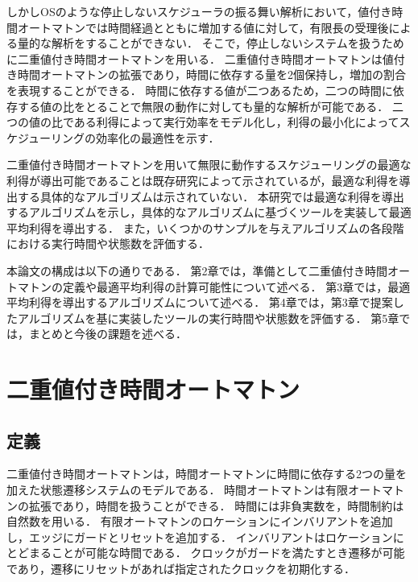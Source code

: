 \documentclass{ieicej}
\begin{document}
しかしOSのような停止しないスケジューラの振る舞い解析において，値付き時間オートマトンでは時間経過とともに増加する値に対して，有限長の受理後による量的な解析をすることができない．
そこで，停止しないシステムを扱うために二重値付き時間オートマトン\cite{dpta}を用いる．
二重値付き時間オートマトンは値付き時間オートマトンの拡張であり，時間に依存する量を2個保持し，増加の割合を表現することができる．
時間に依存する値が二つあるため，二つの時間に依存する値の比をとることで無限の動作に対しても量的な解析が可能である．
二つの値の比である利得によって実行効率をモデル化し，利得の最小化によってスケジューリングの効率化の最適性を示す．

二重値付き時間オートマトンを用いて無限に動作するスケジューリングの最適な利得が導出可能であることは既存研究\cite{dpta}によって示されているが，最適な利得を導出する具体的なアルゴリズムは示されていない．
本研究では最適な利得を導出するアルゴリズムを示し，具体的なアルゴリズムに基づくツールを実装して最適平均利得を導出する．
また，いくつかのサンプルを与えアルゴリズムの各段階における実行時間や状態数を評価する．

本論文の構成は以下の通りである．
第2章では，準備として二重値付き時間オートマトンの定義や最適平均利得の計算可能性について述べる．
第3章では，最適平均利得を導出するアルゴリズムについて述べる．
第4章では，第3章で提案したアルゴリズムを基に実装したツールの実行時間や状態数を評価する．
第5章では，まとめと今後の課題を述べる．




\section{二重値付き時間オートマトン}
\subsection{定義}

二重値付き時間オートマトンは，時間オートマトンに時間に依存する2つの量を加えた状態遷移システムのモデルである．
時間オートマトンは有限オートマトンの拡張であり，時間を扱うことができる．
時間には非負実数を，時間制約は自然数を用いる．
有限オートマトンのロケーションにインバリアントを追加し，エッジにガードとリセットを追加する．
インバリアントはロケーションにとどまることが可能な時間である．
クロックがガードを満たすとき遷移が可能であり，遷移にリセットがあれば指定されたクロックを初期化する．
\end{document}
